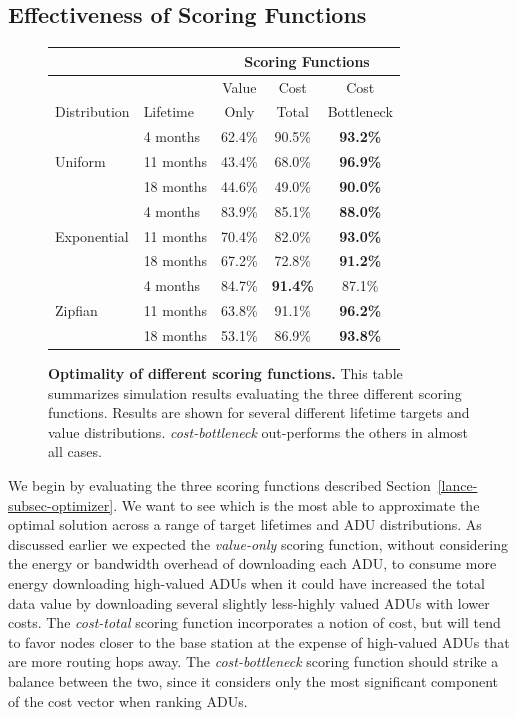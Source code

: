 \subsection{Effectiveness of Scoring Functions}
\label{lance-sec-eval-heuristics}

\begin{figure}[t]
\begin{center}
\begin{tabular}{|l|l|ccc|}
\hline
& & \multicolumn{3}{|c|}{Scoring Functions} \\ \hline
& & Value & Cost & Cost \\
Distribution & Lifetime & Only & Total & Bottleneck \\ \hline
\multirow{3}{*}{Uniform} & 4 months & 62.4\% & 90.5\% & \textbf{93.2\%} \\
& 11 months & 43.4\% & 68.0\% & \textbf{96.9\%} \\
& 18 months & 44.6\% & 49.0\% & \textbf{90.0\%} \\ \hline
\multirow{3}{*}{Exponential} & 4 months & 83.9\% & 85.1\% & \textbf{88.0\%}
\\
& 11 months & 70.4\% & 82.0\% & \textbf{93.0\%} \\
& 18 months & 67.2\% & 72.8\% & \textbf{91.2\%} \\ \hline
\multirow{3}{*}{Zipfian} & 4 months & 84.7\% & \textbf{91.4\%} & 87.1\% \\
& 11 months & 63.8\% & 91.1\% & \textbf{96.2\%} \\
& 18 months & 53.1\% & 86.9\% & \textbf{93.8\%} \\ \hline
\end{tabular}
\end{center}

\caption{\textbf{Optimality of different scoring functions.} This table
summarizes simulation results evaluating the three different scoring
functions. Results are shown for several different lifetime targets and value
distributions. \textit{cost-bottleneck} out-performs the others in almost all
cases.}

\label{lance-fig-table}
\end{figure}

We begin by evaluating the three scoring functions described
Section~\ref{lance-subsec-optimizer}. We want to see which is the most able
to approximate the optimal solution across a range of target lifetimes and
ADU distributions. As discussed earlier we expected the \textit{value-only}
scoring function, without considering the energy or bandwidth overhead of
downloading each ADU, to consume more energy downloading high-valued ADUs
when it could have increased the total data value by downloading several
slightly less-highly valued ADUs with lower costs. The \textit{cost-total}
scoring function incorporates a notion of cost, but will tend to favor nodes
closer to the base station at the expense of high-valued ADUs that are more
routing hops away. The \textit{cost-bottleneck} scoring function should
strike a balance between the two, since it considers only the most
significant component of the cost vector when ranking ADUs.

